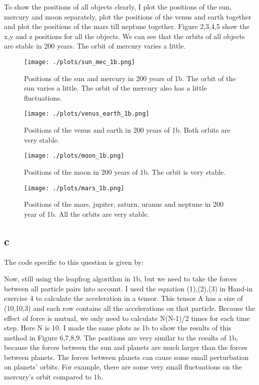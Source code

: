 To show the positions of all objects clearly, I plot the positions of the sun, mercury and moon separately, plot the positions of the venus and earth together and plot the positions of the mars till neptune together. Figure 2,3,4,5 show the x,y and z positions for all the objects. We can see that the orbits of all objects are stable in 200 years. The orbit of mercury varies a little.\\
\begin{figure}[h!]
  \centering
  \texttt{[image: ./plots/sun\_mec\_1b.png]}
  \caption{Positions of the sun and mercury in 200 years of 1b. The orbit of the sun varies a little. The orbit of the mercury also has a little fluctuations. }
  \label{fig2}
\end{figure}

\begin{figure}[h!]
  \centering
  \texttt{[image: ./plots/venus\_earth\_1b.png]}
  \caption{Positions of the venus and earth in 200 years of 1b. Both orbits are very stable.}
  \label{fig3}
\end{figure}

\begin{figure}[h!]
  \centering
  \texttt{[image: ./plots/moon\_1b.png]}
  \caption{Positions of the moon in 200 years of 1b. The orbit is very stable.}
  \label{fig4}
\end{figure}

\begin{figure}[h!]
  \centering
  \texttt{[image: ./plots/mars\_1b.png]}
  \caption{Positions of the mars, jupiter, saturn, uranus and neptune in 200 year of 1b. All the orbits are very stable.}
  \label{fig5}
\end{figure}

\clearpage
\subsection{c}
The code specific to this question is given by:


Now, still using the leapfrog algorithm in 1b, but we need to take the forces between all particle pairs into account. I used the equation (1),(2),(3) in Hand-in exercise 4 to calculate the acceleration in a tensor. This tensor A has a size of (10,10,3) and each row contains all the accelerations on that particle. Because the effect of force is mutual, we only need to calculate N(N-1)/2 times for each time step. Here N is 10. I made the same plots as 1b to show the results of this method in Figure 6,7,8,9. The positions are very similar to the results of 1b, because the forces between the sun and planets are much larger than the forces between planets. The forces between planets can cause some small perturbation on planets' orbits. For example, there are some very small fluctuations on the mercury's orbit compared to 1b.\\

